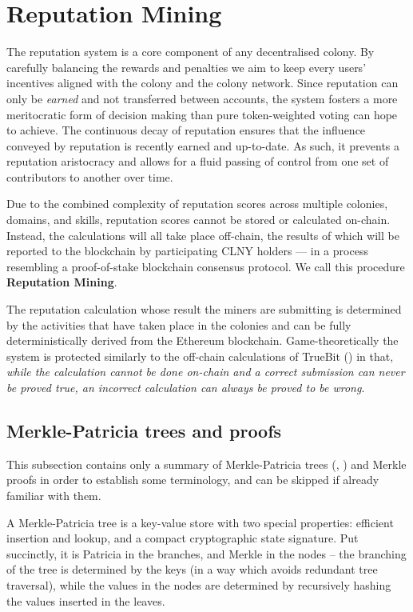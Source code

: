 \section{Reputation Mining}\label{sec:reputationmining}

The reputation system is a core component of any decentralised colony. By carefully balancing the rewards and penalties we aim to keep every users' incentives aligned with the colony and the colony network. Since reputation can only be \emph{earned} and not transferred between accounts, the system fosters a more meritocratic form of decision making than pure token-weighted voting can hope to achieve. The continuous decay of reputation ensures that the influence conveyed by reputation is recently earned and up-to-date. As such, it prevents a reputation aristocracy and allows for a fluid passing of control from one set of contributors to another over time.


Due to the combined complexity of reputation scores across multiple colonies, domains, and skills, reputation scores cannot be stored or calculated on-chain. Instead, the calculations will all take place off-chain, the results of which will be reported to the blockchain by participating CLNY holders --- in a process resembling a proof-of-stake blockchain consensus protocol. We call this procedure \textbf{Reputation Mining}.

The reputation calculation whose result the miners are submitting is determined by the activities that have taken place in the colonies and can be fully deterministically derived from the Ethereum blockchain. Game-theoretically the system is protected similarly to the off-chain calculations of TrueBit (\cite{TruebitWhitepaper}) in that, \emph{while the calculation cannot be done on-chain and a correct submission can never be proved true, an incorrect calculation can always be proved to be wrong}.


\subsection{Merkle-Patricia trees and proofs}\label{sec:Merkle-summary}
This subsection contains only a summary of Merkle-Patricia trees (\cite{MerkleTrees}, \cite{MerkleInEthereum}) and Merkle proofs in order to establish some terminology, and can be skipped if already familiar with them.

A Merkle-Patricia tree is a key-value store with two special properties: efficient insertion and lookup, and a compact cryptographic state signature. Put succinctly, it is Patricia in the branches, and Merkle in the nodes -- the branching of the tree is determined by the keys (in a way which avoids redundant tree traversal), while the values in the nodes are determined by recursively hashing the values inserted in the leaves.


